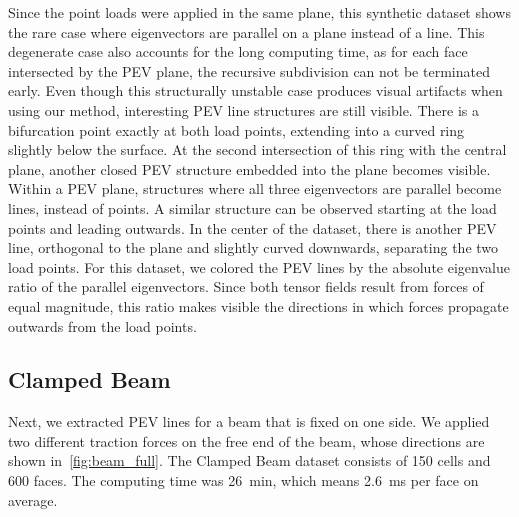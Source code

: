 %
Since the point loads were applied in the same plane, this synthetic dataset
shows the rare case where eigenvectors are parallel on a plane instead of a
line.
%
This degenerate case also accounts for the long computing time, as for each face
intersected by the \ac{PEV} plane, the recursive subdivision can not be terminated
early.
%
Even though this structurally unstable case produces visual artifacts when
using our method, interesting \ac{PEV} line structures are still visible.
%
There is a bifurcation point exactly at both load points, extending into a
curved ring slightly below the surface.
%
At the second intersection of this ring with the central plane, another closed
\ac{PEV} structure embedded into the plane becomes visible.
%
Within a \ac{PEV} plane, structures where all three eigenvectors are parallel become
lines, instead of points.
%
A similar structure can be observed starting at the load points and leading
outwards.
%
In the center of the dataset, there is another \ac{PEV} line, orthogonal to the
plane and slightly curved downwards, separating the two load points.
%
For this dataset, we colored the \ac{PEV} lines by the absolute eigenvalue ratio of
the parallel eigenvectors.
%
Since both tensor fields result from forces of equal magnitude, this ratio makes
visible the directions in which forces propagate outwards from the load points.
%
%
\subsection{Clamped Beam} %
\label{ssub:clamped_beam}
%
%
%
%
%
Next, we extracted \ac{PEV} lines for a beam that is fixed on one side.
%
We applied two different traction forces on the free end of the beam, whose
directions are shown in~\cref{fig:beam_full}.
%
The Clamped Beam dataset consists of \num{150}\si{\kilo} cells and
\num{600}\si{\kilo} faces.
%
The computing time was \SI{26}{\minute}, which means \SI{2.6}{\milli\second}
per face on average.
%

%
%

